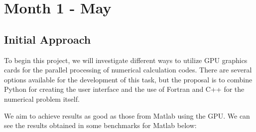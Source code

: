 \section{Month 1 - May}

\subsection{Initial Approach}

To begin this project, we will investigate different ways to utilize GPU graphics cards for the parallel processing of numerical calculation codes. There are several options available for the development of this task, but the proposal is to combine Python for creating the user interface and the use of Fortran and C++ for the numerical problem itself.

We aim to achieve results as good as those from Matlab using the GPU. We can see the results obtained in some benchmarks for Matlab below:

